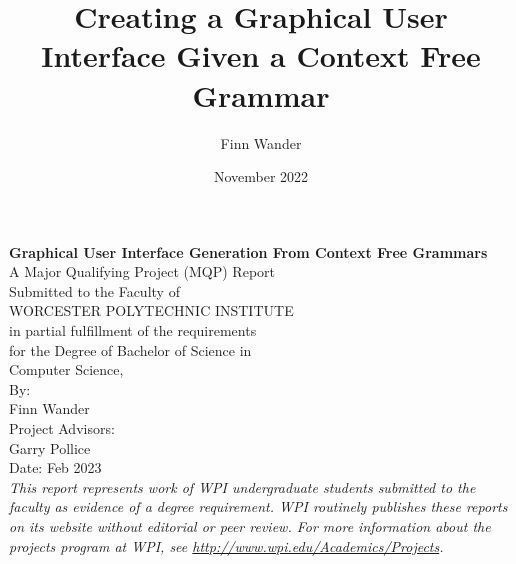 \documentclass[hidelinks,12pt]{article}
\title{Creating a Graphical User Interface Given a Context Free Grammar}
\author{Finn Wander}
\date{November 2022}
\begin{document}
\begin{center}
    \Huge{\textbf{Graphical User Interface Generation From Context Free Grammars}} \\ %
    \vspace{10mm} %
    \large{
    A Major Qualifying Project (MQP) Report \\
    Submitted to the Faculty of \\
    WORCESTER POLYTECHNIC INSTITUTE \\
    in partial fulfillment of the requirements \\
    for the Degree of Bachelor of Science in \\
    } %
    \Large{
    \vspace{5mm} %
    Computer Science, \\ %
    \vspace{10mm} %
    By: \\
    \vspace{5mm} %
    Finn Wander \\ %
    \vspace {25mm} %
    Project Advisors: \\ %
    \vspace{5mm} %
    Garry Pollice \\ %
    \vspace {20mm} %
    Date: Feb 2023 \\ %
    }
    \vspace{10mm} %
    \large{\textit{This report represents work of WPI undergraduate students submitted to the faculty as evidence of a degree requirement. WPI routinely publishes these reports on its website without editorial or peer review. For more information about the projects program at WPI, see \url{http://www.wpi.edu/Academics/Projects}.}} %
\end{center}


\newpage %
\setcounter{page}{1} %
\end{document}
